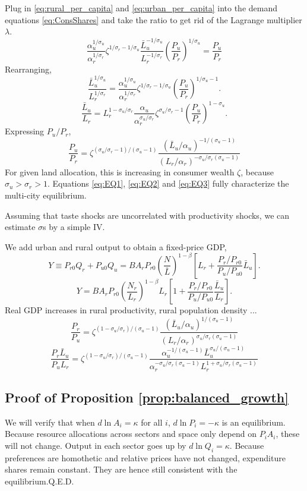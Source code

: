\documentclass[12pt]{article}
\begin{document}
Plug in \eqref{eq:rural_per_capita} and \eqref{eq:urban_per_capita} into the demand equations \eqref{eq:ConsShares} and take the ratio to get rid of the Lagrange multiplier $\lambda$.
\[
\frac{\alpha_u^{1/\sigma_u}}{\alpha_r^{1/\sigma_r}}
\zeta^{1/\sigma_r-1/\sigma_u}
\frac {\bar L_u^{-1/\sigma_u}}
{L_r^{-1/\sigma_r}}
\left(\frac {P_u}{P_r}\right)^{1/\sigma_u}
= \frac {P_u}{P_r}
\]
Rearranging,
\[
\frac {\bar L_u^{1/\sigma_u}}
{L_r^{1/\sigma_r}}
=
\frac{\alpha_u^{1/\sigma_u}}{\alpha_r^{1/\sigma_r}}
\zeta^{1/\sigma_r-1/\sigma_u}
\left(\frac {P_u}{P_r}\right)^{1/\sigma_u-1}
.\]
\[
\frac {\bar L_u}
{L_r}
=
L_r^{1-\sigma_u/\sigma_r}
\frac{\alpha_u}{\alpha_r^{\sigma_u/\sigma_r}}
\zeta^{\sigma_u/\sigma_r-1}
\left(\frac {P_u}{P_r}\right)^{1-\sigma_u}
.\]
Expressing
 $P_u/P_r$,
\begin{equation}\label{eq:EQ3}\tag{iii}
\frac {P_u}{P_r}
=
\zeta^{(\sigma_u/\sigma_r-1)/(\sigma_u-1)}
\frac {(\bar L_u/\alpha_u)^{-1/(\sigma_u-1)}}
{(L_r/\alpha_r)^{-\sigma_u/\sigma_r(\sigma_u-1)}}
\end{equation}
For given land allocation, this is increasing in consumer wealth $\zeta$, because $\sigma_u>\sigma_r>1$. Equations \eqref{eq:EQ1}, \eqref{eq:EQ2} and \eqref{eq:EQ3} fully characterize the multi-city equilibrium.

Assuming that taste shocks are uncorrelated with productivity shocks, we can estimate $\sigma$s by a simple IV.

We add urban and rural output to obtain a fixed-price GDP,
\begin{equation}
	Y \equiv
	P_{r0}Q_r + P_{u0}Q_u
	=
	B A_r P_{r0}\left(\frac {N}
	{{\bar L}}
\right)^{1-\beta}
\left[
L_r
+
\frac{P_r/P_{r0}}{P_u/P_{u0}}
\bar L_u\right].
\end{equation}
\[
	Y =
	B A_r P_{r0}\left(\frac {N_r}
	{L_r}
\right)^{1-\beta} L_r
\left[
1
+
\frac{P_r/P_{r0}}{P_u/P_{u0}}
\frac{\bar L_u}{L_r}
\right].
\]
Real GDP increases in rural productivity, rural population density ...
\[
\frac {P_r}{P_u}
=
\zeta^{(1-\sigma_u/\sigma_r)/(\sigma_u-1)}
\frac {(\bar L_u/\alpha_u)^{1/(\sigma_u-1)}}
{(L_r/\alpha_r)^{\sigma_u/\sigma_r(\sigma_u-1)}}
\]
\[
\frac {P_r \bar L_u}{P_uL_r}
=
\zeta^{(1-\sigma_u/\sigma_r)/(\sigma_u-1)}
\frac {\alpha_u^{-1/(\sigma_u-1)}\bar L_u^{\sigma_u/(\sigma_u-1)}}
{\alpha_r^{-\sigma_u/\sigma_r(\sigma_u-1)}
L_r^{1+\sigma_u/\sigma_r(\sigma_u-1)}}
\]


\subsection{Proof of Proposition \ref{prop:balanced_growth}}
We will verify that when $d\ln A_i=\kappa$ for all $i$, $d\ln P_i=-\kappa$ is an equilibrium. Because resource allocations across sectors and space only depend on $P_iA_i$, these will not change. Output in each sector goes up by $d\ln Q_i = \kappa$. Because preferences are homothetic and relative prices have not changed, expenditure shares remain constant. They are hence still consistent with the equilibrium.\hfill Q.E.D.
\end{document}
